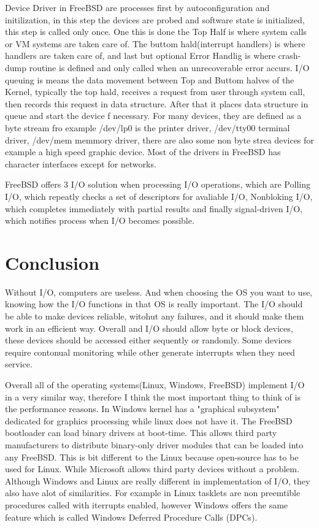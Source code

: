 \documentclass[letterpaper,10pt,draftclsnofoot,onecolumn]{IEEEtran}
\begin{document}
Device Driver in FreeBSD are processes first by autoconfiguration and initilization, in this step the devices are probed and software state is initialized, this step is called only once. One this is done the Top Half is where system calls or VM systems are taken care of. The buttom hald(interrupt handlers) is where handlers are taken care of, and last but optional Error Handlig is where crash-dump routine is defined and only called when an unrecoverable error accurs. I/O queuing is means the data movement between Top and Buttom halves of the Kernel, typically the top hald, receives a request from user through system call, then records this request in data structure. After that it places data structure in queue and start the device f necessary. For many devices, they are defined as a byte stream fro example /dev/lp0 is the printer driver, /dev/tty00 terminal driver, /dev/mem memmory driver, there are also some non byte strea devices for example a high speed graphic device. Most of the drivers in FreeBSD has character interfaces except for networks.


FreeBSD offers 3 I/O solution when processing I/O operations, which are Polling I/O, which repeatly checks a set of descriptors for avaliable I/O, Nonbloking I/O, which completes immediately with partial results and finally signal-driven I/O, which notifies process when I/O becomes possible.\cite{[2]}

\section*{Conclusion}

Without I/O, computers are useless. And when choosing the OS you want to use, knowing how the I/O functions in that OS is really important. The I/O should be able to make devices reliable, witohut any failures, and it should make them work in an efficient way. Overall and I/O should allow byte or block devices, these devices should be accessed either sequently or randomly. Some devices require contonual monitoring while other generate interrupts when they need service.

Overall all of the operating systems(Linux, Windows, FreeBSD) implement I/O in a very similar way, therefore I think the most important thing to think of is the performance reasons. In Windows kernel has a "graphical subsystem" dedicated for graphics processing while linux does not have it. The FreeBSD bootloader can load binary drivers at boot-time. This allows third party manufacturers to distribute binary-only driver modules that can be loaded into any FreeBSD. This is bit different to the Linux because open-source has to be used for Linux. While Microsoft allows third party devices without a problem. Although Windows and Linux are really different in implementation of I/O, they also have alot of similarities. For example in Linux tasklets are non preemtible procedures called with iterrupts enabled, however Windows offers the same feature which is called Windows Deferred Procedure Calls (DPCs).
\end{document}
